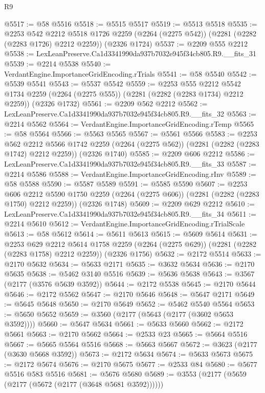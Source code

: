 \begin{lexlean}{R9}
\begin{coremodule}
@5517 := @58 @5516
@5518 := @5515 @5517
@5519 := @5513 @5518
@5535 := @2253
    @542
    @2212
    @5518
    @1726
    @2259
    (@2264 (@2275 @542))
    (@2281 (@2282 (@2283 @1726) @2212 @2259))
    (@2326 @1724)
@5537 := @2209 @555 @2212
@5538 := LexLeanPreserve.Ca1d3341990da937b7032e945f34cb805.R9.__fits_31
@5539 := @2214 @5538
@5540 := VerdantEngine.ImportanceGridEncoding.rTrials
@5541 := @58 @5540
@5542 := @5539 @5541
@5543 := @5537 @5542
@5559 := @2253
    @555
    @2212
    @5542
    @1734
    @2259
    (@2264 (@2275 @555))
    (@2281 (@2282 (@2283 @1734) @2212 @2259))
    (@2326 @1732)
@5561 := @2209 @562 @2212
@5562 := LexLeanPreserve.Ca1d3341990da937b7032e945f34cb805.R9.__fits_32
@5563 := @2214 @5562
@5564 := VerdantEngine.ImportanceGridEncoding.rTemp
@5565 := @58 @5564
@5566 := @5563 @5565
@5567 := @5561 @5566
@5583 := @2253
    @562
    @2212
    @5566
    @1742
    @2259
    (@2264 (@2275 @562))
    (@2281 (@2282 (@2283 @1742) @2212 @2259))
    (@2326 @1740)
@5585 := @2209 @606 @2212
@5586 := LexLeanPreserve.Ca1d3341990da937b7032e945f34cb805.R9.__fits_33
@5587 := @2214 @5586
@5588 := VerdantEngine.ImportanceGridEncoding.rInv
@5589 := @58 @5588
@5590 := @5587 @5589
@5591 := @5585 @5590
@5607 := @2253
    @606
    @2212
    @5590
    @1750
    @2259
    (@2264 (@2275 @606))
    (@2281 (@2282 (@2283 @1750) @2212 @2259))
    (@2326 @1748)
@5609 := @2209 @629 @2212
@5610 := LexLeanPreserve.Ca1d3341990da937b7032e945f34cb805.R9.__fits_34
@5611 := @2214 @5610
@5612 := VerdantEngine.ImportanceGridEncoding.rTrialScale
@5613 := @58 @5612
@5614 := @5611 @5613
@5615 := @5609 @5614
@5631 := @2253
    @629
    @2212
    @5614
    @1758
    @2259
    (@2264 (@2275 @629))
    (@2281 (@2282 (@2283 @1758) @2212 @2259))
    (@2326 @1756)
@5632 := @2172 @5514
@5633 := @2170 @5632
@5634 := @5633 @2171
@5635 := @3632 @5634
@5636 := @2170 @5635
@5638 := @5462 @3140 @5516
@5639 := @5636 @5638
@5643 := @3567 (@2177 (@3576 @5639 @3592))
@5644 := @2172 @5538
@5645 := @2170 @5644
@5646 := @2172 @5562
@5647 := @2170 @5646
@5648 := @5647 @2171
@5649 := @5645 @5648
@5650 := @2170 @5649
@5652 := @5462 @5540 @5564
@5653 := @5650 @5652
@5659 := @3560 (@2177 (@5643 (@2177 (@3602 @5653 @3592))))
@5660 := @5647 @5634
@5661 := @5633 @5660
@5662 := @2172 @5661
@5663 := @2170 @5662
@5664 := @2533 @23
@5665 := @5664 @5516
@5667 := @5665 @5564 @5516
@5668 := @5663 @5667
@5672 := @3623 (@2177 (@3630 @5668 @3592))
@5673 := @2172 @5634
@5674 := @5633 @5673
@5675 := @2172 @5674
@5676 := @2170 @5675
@5677 := @2533 @84
@5680 := @5677 @5516 @583 @5516
@5681 := @5676 @5680
@5689 := @3553 (@2177 (@5659 (@2177 (@5672 (@2177 (@3648 @5681 @3592))))))

\end{coremodule}
\end{lexlean}
